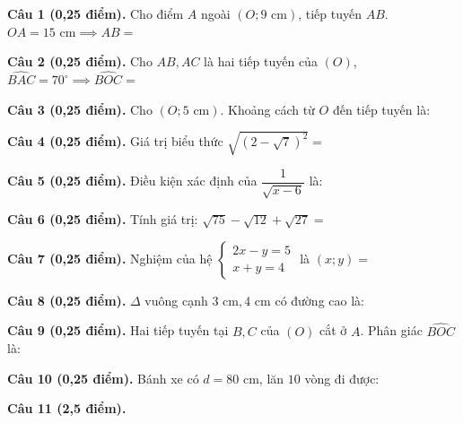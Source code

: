 \documentclass[12pt,a4paper]{article}
\begin{document}
\vspace{1.2mm}
\noindent\textbf{Câu 1 (0,25 điểm).} Cho điểm $A$ ngoài $(O; 9\text{ cm})$, tiếp tuyến $AB$. $OA = 15\text{ cm} \implies AB =$ \par\vspace{0.8mm}
\noindent\textbf{Câu 2 (0,25 điểm).} Cho $AB, AC$ là hai tiếp tuyến của $(O)$, $\widehat{BAC} = 70^\circ \implies \widehat{BOC} =$ \par\vspace{0.8mm}
\noindent\textbf{Câu 3 (0,25 điểm).} Cho $(O; 5\text{ cm})$. Khoảng cách từ $O$ đến tiếp tuyến là: \par\vspace{0.8mm}
\noindent\textbf{Câu 4 (0,25 điểm).} Giá trị biểu thức $\sqrt{(2 - \sqrt{7})^2} =$ \par\vspace{0.8mm}
\noindent\textbf{Câu 5 (0,25 điểm).} Điều kiện xác định của $\dfrac{1}{\sqrt{x - 6}}$ là: \par\vspace{0.8mm}
\noindent\textbf{Câu 6 (0,25 điểm).} Tính giá trị: $\sqrt{75} - \sqrt{12} + \sqrt{27} =$ \par\vspace{0.8mm}
\noindent\textbf{Câu 7 (0,25 điểm).} Nghiệm của hệ $\begin{cases} 2x - y = 5 \\ x + y = 4 \end{cases}$ là $(x; y) =$ \par\vspace{0.8mm}
\noindent\textbf{Câu 8 (0,25 điểm).} $\Delta$ vuông cạnh $3\text{ cm}, 4\text{ cm}$ có đường cao là: \par\vspace{0.8mm}
\noindent\textbf{Câu 9 (0,25 điểm).} Hai tiếp tuyến tại $B, C$ của $(O)$ cắt ở $A$. Phân giác $\widehat{BOC}$ là: \par\vspace{0.8mm}
\noindent\textbf{Câu 10 (0,25 điểm).} Bánh xe có $d = 80\text{ cm}$, lăn $10$ vòng đi được: \par\vspace{0.8mm}
\vspace{0.6mm}
\noindent\textbf{Câu 11 (2,5 điểm).}
\vspace{0.6mm}
\end{document}
